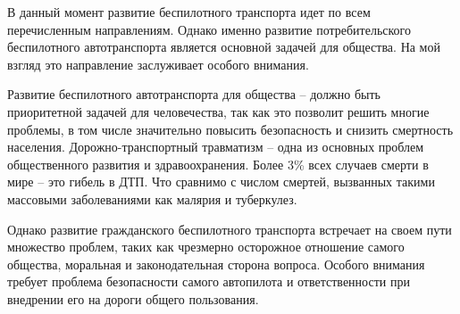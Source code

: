 В данный момент развитие беспилотного транспорта идет по всем перечисленным 
направлениям. Однако именно развитие потребительского беспилотного 
автотранспорта является основной задачей для общества. На мой взгляд это направление 
заслуживает особого внимания.


Развитие беспилотного автотранспорта для общества – должно быть приоритетной 
задачей для человечества, так как это позволит решить многие проблемы, в том 
числе значительно повысить безопасность и снизить смертность населения.
Дорожно-транспортный травматизм – одна из основных проблем общественного 
развития и здравоохранения. Более 3\% 
всех случаев смерти в мире -- это гибель в ДТП. Что сравнимо с числом смертей, 
вызванных такими массовыми заболеваниями как малярия и туберкулез. 

Однако развитие гражданского беспилотного транспорта встречает на своем пути 
множество проблем, таких как чрезмерно осторожное отношение самого общества,
моральная и законодательная сторона вопроса. Особого внимания требует проблема 
безопасности самого автопилота и ответственности при внедрении 
его на дороги общего пользования.

